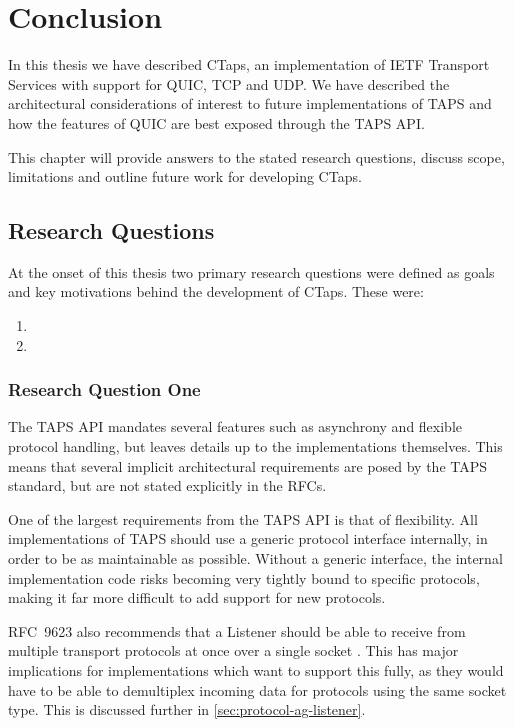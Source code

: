 \chapter{Conclusion}\label{chap:conc}
In this thesis we have described CTaps, an implementation of IETF Transport Services
with support for QUIC, TCP and UDP.
We have described the architectural considerations of interest to future implementations of TAPS
and how the features of QUIC are best exposed through the TAPS API. 

This chapter will provide answers to the stated research questions,
discuss scope, limitations and outline future work for developing CTaps.

\section{Research Questions}
At the onset of this thesis two primary research questions were defined
as goals and key motivations behind the development of CTaps. These
were:

\begin{enumerate}
    \item \rqone
    \item \rqtwo
\end{enumerate}

\subsection{Research Question One}\label{sec:rq1-answer}
The TAPS API mandates several features such as asynchrony
and flexible protocol handling, but leaves details up to the
implementations themselves. This means that several
implicit architectural requirements are posed by the TAPS standard, but are not
stated explicitly in the RFCs.

One of the largest requirements from the TAPS API is that of flexibility.
All implementations of TAPS
should use a generic protocol interface internally, in order to be as maintainable as possible.
Without a generic interface, the internal implementation code
risks becoming very tightly bound to specific protocols, making it
far more difficult to add support for new protocols.

RFC~9623 also recommends that a Listener should
be able to receive from multiple transport protocols at once over a single
socket \cite[sec. 4.7]{rfc9623}.
This has major implications for implementations which want to support
this fully, as they would have to be able to demultiplex incoming data
for protocols using the same socket type. 
This is discussed further in \cref{sec:protocol-ag-listener}.

